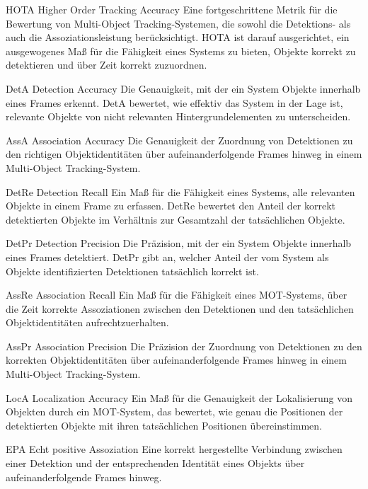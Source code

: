 \newglossaryentrywithacronym
{HOTA}
{Higher Order Tracking Accuracy}
{Eine fortgeschrittene Metrik für die Bewertung von Multi-Object Tracking-Systemen, die sowohl die Detektions- als auch die Assoziationsleistung berücksichtigt. HOTA ist darauf ausgerichtet, ein ausgewogenes Maß für die Fähigkeit eines Systems zu bieten, Objekte korrekt zu detektieren und über Zeit korrekt zuzuordnen.}

\newglossaryentrywithacronym
{DetA}
{Detection Accuracy}
{Die Genauigkeit, mit der ein System Objekte innerhalb eines Frames erkennt. DetA bewertet, wie effektiv das System in der Lage ist, relevante Objekte von nicht relevanten Hintergrundelementen zu unterscheiden.}

\newglossaryentrywithacronym
{AssA}
{Association Accuracy}
{Die Genauigkeit der Zuordnung von Detektionen zu den richtigen Objektidentitäten über aufeinanderfolgende Frames hinweg in einem Multi-Object Tracking-System.}

\newglossaryentrywithacronym
{DetRe}
{Detection Recall}
{Ein Maß für die Fähigkeit eines Systems, alle relevanten Objekte in einem Frame zu erfassen. DetRe bewertet den Anteil der korrekt detektierten Objekte im Verhältnis zur Gesamtzahl der tatsächlichen Objekte.}

\newglossaryentrywithacronym
{DetPr}
{Detection Precision}
{Die Präzision, mit der ein System Objekte innerhalb eines Frames detektiert. DetPr gibt an, welcher Anteil der vom System als Objekte identifizierten Detektionen tatsächlich korrekt ist.}

\newglossaryentrywithacronym
{AssRe}
{Association Recall}
{Ein Maß für die Fähigkeit eines MOT-Systems, über die Zeit korrekte Assoziationen zwischen den Detektionen und den tatsächlichen Objektidentitäten aufrechtzuerhalten.}

\newglossaryentrywithacronym
{AssPr}
{Association Precision}
{Die Präzision der Zuordnung von Detektionen zu den korrekten Objektidentitäten über aufeinanderfolgende Frames hinweg in einem Multi-Object Tracking-System.}

\newglossaryentrywithacronym
{LocA}
{Localization Accuracy}
{Ein Maß für die Genauigkeit der Lokalisierung von Objekten durch ein MOT-System, das bewertet, wie genau die Positionen der detektierten Objekte mit ihren tatsächlichen Positionen übereinstimmen.}

\newglossaryentrywithacronym
{EPA}
{Echt positive Assoziation}
{Eine korrekt hergestellte Verbindung zwischen einer Detektion und der entsprechenden Identität eines Objekts über aufeinanderfolgende Frames hinweg.}

